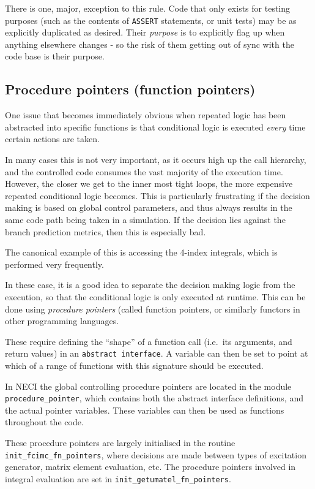 \documentclass[a4paper,notitlepage,dvipsnames]{scrreprt}
\let\code\lstinline
\begin{document}
	There is one, major, exception to this rule. Code that only exists for
	testing purposes (such as the contents of \code{ASSERT} statements,
	or unit tests) may be as explicitly duplicated as
	desired. Their \emph{purpose} is to explicitly flag up when anything
	elsewhere changes - so the risk of them getting out of sync with the code
	base is their purpose.


	\subsection{Procedure pointers (function pointers)}
		One issue that becomes immediately obvious when repeated logic has
		been abstracted into specific functions is that conditional logic is
		executed \emph{every} time certain actions are taken.

		In many cases this is not very important, as it occurs high up the
		call hierarchy, and the controlled code consumes the vast majority of
		the execution time. However, the closer we get to the inner most tight
		loops, the more expensive repeated conditional logic becomes. This
		is particularly frustrating if the decision making is based on global
		control parameters, and thus always results in the same code path being
		taken in a simulation. If the decision lies against the branch
		prediction metrics, then this is especially bad.

		The canonical example of this is accessing the 4-index integrals, which
		is performed very frequently.

		In these case, it is a good idea to separate the decision making logic
		from the execution, so that the conditional logic is only executed at
		runtime. This can be done using \emph{procedure pointers} (called
		function pointers, or similarly functors in other programming
		languages.

		These require defining the ``shape'' of a function call (i.e.\ its
		arguments, and return values) in an \code{abstract interface}. A
		variable can then be set to point at which of a range of functions
		with this signature should be executed.

		In NECI the global controlling procedure pointers are located in
		the module \code{procedure_pointer}, which contains both the abstract
		interface definitions, and the actual pointer variables. These
		variables can then be used as functions throughout the code.

		These procedure pointers are largely initialised in the routine
		\code{init_fcimc_fn_pointers}, where decisions are made between types
		of excitation generator, matrix element evaluation, etc. The procedure
		pointers involved in integral evaluation are set in
		\code{init_getumatel_fn_pointers}.
\end{document}
